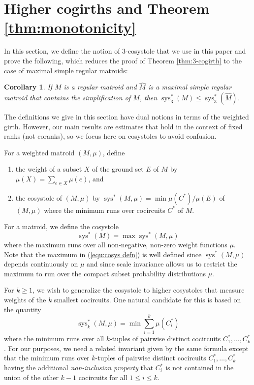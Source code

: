 \documentclass[reqno,12pt]{amsart}
\newtheorem{corollary}[theorem]{Corollary}
\numberwithin{theorem}{section}
\theoremstyle{plain}
\theoremstyle{definition}
\theoremstyle{remark}
\numberwithin{equation}{section}
\numberwithin{table}{section}
\DeclareMathOperator{\sys}{sys}
\begin{document}
\vspace{1em}
\section{Higher cogirths and Theorem \ref{thm:monotonicity}}\label{sec:HigherCogirths}
\vspace{1em}

In this section, we define the notion of $3$-cosystole that we use in this paper and prove the following, which reduces the proof of Theorem \ref{thm:3-cogirth} to the case of maximal simple regular matroids:

\begin{corollary}\label{cor:reduction}
    If $M$ is a regular matroid and $\hat M$ is a maximal simple regular matroid that contains the simplification of $M$, then $\sys_3^*(M) \leq \sys_3^*(\hat M)$.
\end{corollary}

The definitions we give in this section have dual notions in terms of the weighted girth. However, our main results are estimates that hold in the context of fixed ranks (not coranks), so we focus here on cosystoles to avoid confusion.

For a weighted matroid $(M, \mu)$, define

\begin{enumerate}
    \item the weight of a subset $X$ of the ground set $E$ of $M$ by $\mu(X) = \sum_{e \in X} \mu(e)$,  and
    \item the cosystole of $(M, \mu)$ by $\sys^*(M,\mu) = \min \mu(C^*)/\mu(E)$ of $(M, \mu)$ where the minimum runs over cocircuits $C^*$ of $M$.
\end{enumerate}
For a matroid, we define the cosystole 
    \begin{equation}\label{equ:cosys defn}
        \sys^*(M) = \max \sys^*(M, \mu)
    \end{equation}
where the maximum runs over all non-negative, non-zero weight functions $\mu$. Note that the maximum in (\ref{equ:cosys defn}) is well defined since $\sys^*(M, \mu)$ depends continuously on $\mu$ and since scale invariance allows us to restrict the maximum to run over the compact subset probability distributions $\mu$.

For $k \geq 1$, we wish to generalize the cosystole to higher cosystoles that measure weights of the $k$ smallest cocircuits. One natural candidate for this is based on the quantity
    \[\sys_k^*(M, \mu) = \min \sum_{i=1}^{k} \mu(C_i^*)\]
where the minimum runs over all $k$-tuples of pairwise distinct cocircuits $C_1^*,\ldots,C_k^*$. For our purposes, we need a related invariant given by
the same formula except that the minimum runs over $k$-tuples of pairwise distinct cocircuits $C_1^*, \ldots, C_k^*$ having the additional {\it non-inclusion property} that $C_i^*$ is not contained in the union of the other $k-1$ cocircuits for all $1 \leq i \leq k$. 
\end{document}
